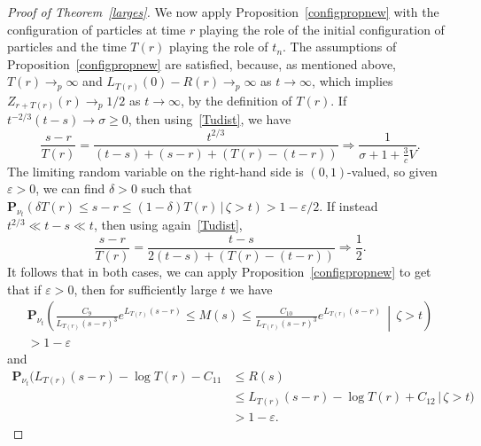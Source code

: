 \documentclass[10pt]{amsart}
\theoremstyle{definition}\newtheorem{defi}[theo]{Definition}\newtheorem{rema}[theo]{Remark}\newtheorem{exam}[theo]{Example}\newtheorem{exem}[theo]{Example}\newtheorem{nota}[theo]{Notation}
\newcommand*\eps{\varepsilon}
\renewcommand*\P{\mathbf{P}}
\newcommand{\1} {\mathds{1}}
\renewcommand*\to{\rightarrow}
\begin{document}
\begin{proof}[Proof of Theorem~\ref{larges}]
We now apply Proposition~\ref{configpropnew} with the configuration of particles at time $r$ playing the role of the initial configuration of particles and the time $T(r)$ playing the role of $t_n$. The assumptions of Proposition~\ref{configpropnew} are satisfied, because, as mentioned above, $T(r) \rightarrow_p \infty$ and $L_{T(r)}(0) - R(r) \rightarrow_p \infty$ as $t \rightarrow \infty$, which implies $Z_{r+T(r)}(r) \rightarrow_p 1/2$ as $t\to\infty$, by the definition of $T(r)$. If $t^{-2/3}(t - s) \to \sigma \geq 0$, then using~\eqref{Tudist}, we have
\begin{equation}\label{strat1}
\frac{s - r}{T(r)} = \frac{t^{2/3}}{(t - s) + (s - r) + (T(r) - (t - r))} \Rightarrow \frac{1}{\sigma + 1 + \frac{3}{c}V}.
\end{equation}
The limiting random variable on the right-hand side is $(0,1)$-valued, so given $\eps > 0$, we can find $\delta > 0$ such that $\P_{\nu_t}(\delta T(r) \leq s - r \leq (1 - \delta)T(r) \,|\, \zeta > t) > 1 - \eps/2$. If instead $t^{2/3} \ll t - s \ll t$, then using again~\eqref{Tudist},
\begin{equation}\label{strat2}
\frac{s - r}{T(r)} = \frac{t - s}{2(t - s) + (T(r) - (t - r))} \Rightarrow \frac{1}{2}.
\end{equation}
It follows that in both cases, we can apply Proposition~\ref{configpropnew} to get that if $\eps > 0$, then for sufficiently large $t$ we have
\begin{multline}\label{Me1}
\P_{\nu_t} \left(\frac{C_{9}}{L_{T(r)}(s-r)^3} e^{L_{T(r)}(s-r)} \leq M(s) \leq \frac{C_{10}}{L_{T(r)}(s-r)^3} e^{L_{T(r)}(s-r)} \,\middle|\, \zeta > t \right)\\
 > 1 - \eps
\end{multline}
and
\begin{equation}\label{Re1}
\begin{split}
\P_{\nu_t} \big(L_{T(r)}(s-r) - \log T(r) - C_{11} &\leq R(s)\\
&\leq L_{T(r)}(s-r) - \log T(r) + C_{12} \,\big|\, \zeta > t \big)\\
 &> 1 - \eps.
 \end{split}
\end{equation}


\end{proof}
\end{document}
